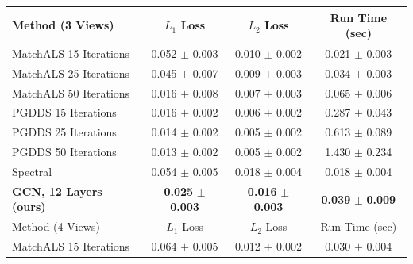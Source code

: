 \documentclass[10pt,twocolumn,letterpaper]{article}
\begin{document}
\begin{table}
\begin{center}
\begin{tabular}{|l|c|c|c|}
\hline
Method (3 Views)                                          & $L_1$ Loss                          & $L_2$ Loss                          & Run Time (sec)                      \\
\hline\hline
MatchALS \cite{zhou2015multi} 15 Iterations               & 0.052 $\pm$ 0.003                   & 0.010 $\pm$ 0.002                   & 0.021 $\pm$ 0.003                   \\
MatchALS \cite{zhou2015multi} 25 Iterations               & 0.045 $\pm$ 0.007                   & 0.009 $\pm$ 0.003                   & 0.034 $\pm$ 0.003                   \\
MatchALS \cite{zhou2015multi} 50 Iterations               & 0.016 $\pm$ 0.008                   & 0.007 $\pm$ 0.003                   & 0.065 $\pm$ 0.006                   \\ \hline
PGDDS \cite{leonardos2016distributed} 15 Iterations       & 0.016 $\pm$ 0.002                   & 0.006 $\pm$ 0.002                   & 0.287 $\pm$ 0.043                   \\
PGDDS \cite{leonardos2016distributed} 25 Iterations       & 0.014 $\pm$ 0.002                   & 0.005 $\pm$ 0.002                   & 0.613 $\pm$ 0.089                   \\
PGDDS \cite{leonardos2016distributed} 50 Iterations       & 0.013 $\pm$ 0.002                   & 0.005 $\pm$ 0.002                   & 1.430 $\pm$ 0.234                   \\ \hline
Spectral                                                  & 0.054 $\pm$ 0.005                   & 0.018 $\pm$ 0.004                   & 0.018 $\pm$ 0.004                   \\ \hline 
\textbf{GCN, 12 Layers (ours)}                            & \textbf{0.025} $\pm$ \textbf{0.003} & \textbf{0.016} $\pm$ \textbf{0.003} & \textbf{0.039} $\pm$ \textbf{0.009} \\
\hline\hline
Method (4 Views)                                                         & $L_1$ Loss                          & $L_2$ Loss                          & Run Time (sec)                     \\
\hline\hline
MatchALS \cite{zhou2015multi} 15 Iterations                              & 0.064 $\pm$ 0.005                   & 0.012 $\pm$ 0.002                   & 0.030 $\pm$ 0.004                   \\

\end{tabular}
\end{center}
\end{table}
\end{document}
